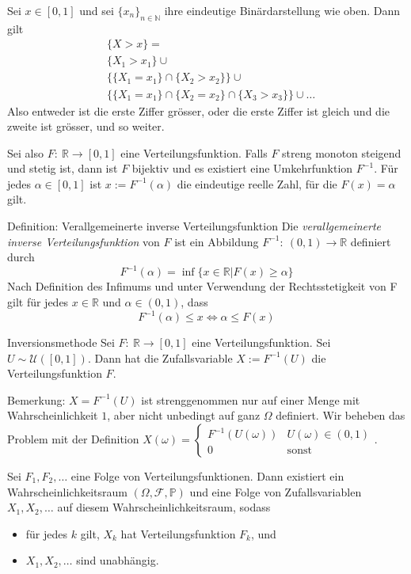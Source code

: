 \documentclass[a4paper,10pt]{article}
\def\N{\mathbb{N}}
\def\R{\mathbb{R}}
\def\P{\mathbb{P}}
\begin{document}
\begin{subbox}{}
    Sei \( x \in [0, 1] \) und sei \( \{x_n\}_{n \in \N} \) ihre eindeutige Binärdarstellung wie oben. Dann gilt
    \begin{align*}
        &\{X > x\} = \\
        &\{X_1 > x_1\} \cup \\
        &\{\{X_1 = x_1\} \cap \{X_2 > x_2\}\} \cup \\
        &\{\{X_1 = x_1\} \cap \{X_2 = x_2\} \cap \{X_3 > x_3\}\} \cup \dots
    \end{align*}
    Also entweder ist die erste Ziffer grösser, oder die erste Ziffer ist gleich und die zweite ist grösser, und so weiter.
\end{subbox}

Sei also \( F: \: \R \to [0, 1] \) eine Verteilungsfunktion. Falls \( F \) streng monoton steigend und stetig ist, dann ist \( F \) bijektiv und es existiert eine Umkehrfunktion \( F^{-1} \). Für jedes \( \alpha \in [0, 1] \) ist \( x := F^{-1}(\alpha) \) die eindeutige reelle Zahl, für die \( F(x) = \alpha \) gilt.

\begin{mainbox}{Definition: Verallgemeinerte inverse Verteilungsfunktion}
    Die \emph{verallgemeinerte inverse Verteilungsfunktion} von \( F \) ist ein Abbildung \( F^{-1}: \: (0, 1) \to \R \) definiert durch
    \[ F^{-1}(\alpha) = \inf\{x \in \R | F(x) \geq \alpha\} \]
    Nach Definition des Infimums und unter Verwendung der Rechtsstetigkeit von F gilt für jedes \( x \in \R \) und \( \alpha \in (0, 1) \), dass
    \[ F^{-1}(\alpha) \leq x \iff \alpha \leq F(x) \]
\end{mainbox}

\begin{subbox}{Inversionsmethode}
    Sei \( F: \: \R \to [0,1] \) eine Verteilungsfunktion. Sei \( U \sim \mathcal{U}([0, 1]) \). Dann hat die Zufallsvariable \( X := F^{-1}(U) \) die Verteilungsfunktion \( F \).
\end{subbox}

Bemerkung: \( X = F^{-1}(U) \) ist strenggenommen nur auf einer Menge mit Wahrscheinlichkeit \( 1 \), aber nicht unbedingt auf ganz \( \Omega \) definiert. Wir beheben das Problem mit der Definition \( X(\omega) = \begin{cases}
    F^{-1}(U(\omega)) & U(\omega) \in (0, 1) \\
    0 & \text{sonst}
\end{cases} \).

\begin{subbox}{}
    Sei \( F_1, F_2, \dots \) eine Folge von Verteilungsfunktionen. Dann existiert ein Wahrscheinlichkeitsraum \( (\Omega, \mathcal{F}, \P) \) und eine Folge von Zufallsvariablen \( X_1, X_2, \dots \) auf diesem Wahrscheinlichkeitsraum, sodass
    \begin{itemize}
        \item für jedes \( k \) gilt, \( X_k \) hat Verteilungsfunktion \( F_k \), und
        \item \( X_1, X_2, \dots \) sind unabhängig.
    \end{itemize}
\end{subbox}
\end{document}
